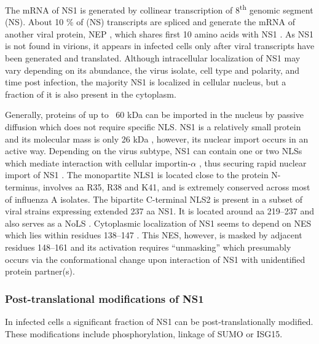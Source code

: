 		The mRNA of \gls{NS1} is generated by collinear transcription of 8\textsuperscript{th} genomic segment (NS). About 10 \% of (NS) transcripts are spliced and generate the mRNA of another viral protein, \gls{NEP} \parencite{Lamb1980}, which shares first 10 amino acids with \gls{NS1} \parencite{Inglis1979, Lamb1979, Lamb1980}. As \gls{NS1} is not found in virions, it appears in infected cells only after viral transcripts have been generated and translated. Although intracellular localization of \gls{NS1} may vary depending on its abundance, the virus isolate, cell type and polarity, and time post infection, the majority \gls{NS1} is localized in cellular nucleus, but a fraction of it is also present in the cytoplasm\parencite{Melen2007, Melen2012, Newby2007, Li1998, Greenspan1988}. 
		
		Generally, proteins of up to ~60 kDa can be imported in the nucleus by passive diffusion \parencite{Macara2001, Wang2007} which does not require specific \gls{NLS}. \gls{NS1} is a relatively small protein and its molecular mass is only 26 kDa \parencite{Ward1994}, however, its nuclear import occurs in an active way. Depending on the virus subtype, \gls{NS1} can contain one or two \glspl{NLS} which mediate interaction with cellular importin-$\alpha$ \parencite{Melen2007}, thus securing rapid nuclear import of \gls{NS1} \parencite{Privalsky1981}. The monopartite \gls{NLS}1 is located close to the protein N-terminus, involves aa R35, R38 and K41, and is extremely conserved across most of influenza A isolates. The bipartite C-terminal NLS2 is present in a subset of viral strains expressing extended 237 \gls{aa} \gls{NS1}. It is located around \gls{aa} 219--237 and also serves as a \gls{NoLS} \parencite{Melen2007, Melen2012}. Cytoplasmic localization of \gls{NS1} seems to depend on \gls{NES} which lies within residues 138--147 \parencite{Li1998}. This \gls{NES}, however, is masked by adjacent residues 148--161 and its activation requires ``unmasking'' which presumably occurs via the conformational change upon interaction of \gls{NS1} with unidentified protein partner(s). 
		
		\subsubsection{Post-translational modifications of NS1}
		
		In infected cells a significant fraction of \gls{NS1} can be post-translationally modified. These modifications include phosphorylation, linkage of \gls{SUMO} or \gls{ISG15}.
		
